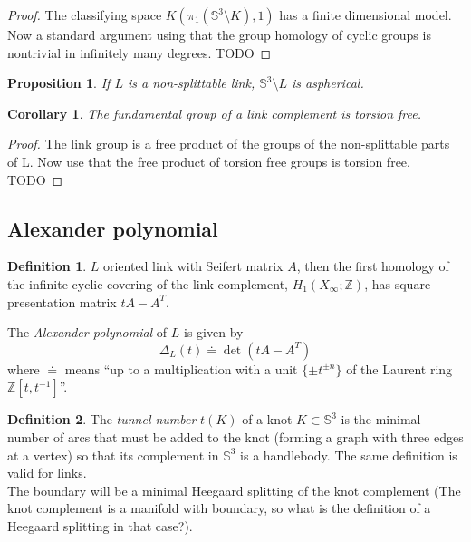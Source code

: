\documentclass[nobib]{tufte-book} %
\newtheorem{proposition}{Proposition}
\newtheorem{corollary}{Corollary}
\theoremstyle{definition}
\newtheorem{definition}{Definition}
\theoremstyle{remark}
\newtheorem{remark}{Remark}
\newcommand{\sphere}[1]{\mathbb{S}^{#1}}
\newcommand{\Z}{\mathbb{Z}}
\begin{document}
\begin{proof}
	The classifying space $K(\pi_1(\sphere{3} \setminus K), 1)$
	has a finite dimensional model.
	Now a standard argument using that the group homology of
	cyclic groups is nontrivial in infinitely many degrees.
	TODO
\end{proof}

\begin{proposition}
	If $L$ is a non-splittable link, $\sphere{3} \setminus L$
	is aspherical.
\end{proposition}

\begin{corollary}
	The fundamental group of a link complement is torsion free.
\end{corollary}
\begin{proof}
	The link group is a free product of the groups
	of the non-splittable parts of L.
	Now use that the free product of torsion free groups is
	torsion free. 
	TODO 
\end{proof}





\subsection{Alexander polynomial}

\begin{definition}
	$L$ oriented link with Seifert matrix $A$, then the first homology of
	the infinite cyclic covering of the link complement, $H_1(X_{\infty} ; \Z)$,
	has square presentation matrix $t A - A^{T}$.
	
	The \textit{Alexander polynomial} of $L$ is given by
	\begin{equation*}
		\Delta_{L}(t) \doteq \det(t A - A^{T})
	\end{equation*}
	where $\doteq$ means ``up to a multiplication with a unit $\{ \pm t^{\pm n} \}$
	of the Laurent ring $\Z[t, t^{-1}]$''.
	\marginnote{
		\begin{remark}
			$\Z[t^{\pm 1}]$ is \textbf{not} a PID.
		\end{remark}
	}
\end{definition}




\begin{definition}
	The \textit{tunnel number} $t(K)$ of a knot $K \subset \sphere{3}$ is the minimal number of arcs
	that must be added to the knot (forming a graph with three edges at a vertex) so that
	its complement in $\sphere{3}$ is a handlebody. The same definition is
	valid for links. \\
	The boundary will be a minimal Heegaard splitting of the knot complement
	(The knot complement is a manifold with boundary, so what is the definition
	of a Heegaard splitting in that case?).
\end{definition}
\end{document}
